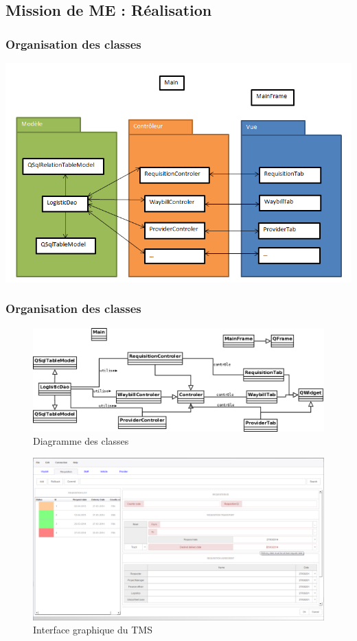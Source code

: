 \subsection{Mission de ME : Réalisation}
	\begin{frame}
		\frametitle{Organisation des classes}
		\begin{center}
			\includegraphics[scale=0.45]{Images/OrganisationClasses}
		\end{center}
	\end{frame}
	\begin{frame}
		\frametitle{Organisation des classes}
		\begin{figure}[htbp]
			\centering
			\includegraphics[scale=0.2]{Images/DiagrammeClasses}
			\caption{Diagramme des classes}
		\end{figure}
	\end{frame}
	\begin{frame}
		\begin{figure}[htbp]
			\centering
			\includegraphics[scale=0.24]{Images/Interface}
			\caption{Interface graphique du TMS}
		\end{figure}
	\end{frame}